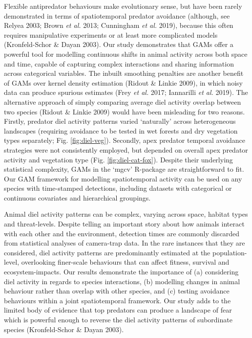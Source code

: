 \documentclass[11pt,a4paper,titlepage,twoside,openright]{style/unimelbthesis}
\begin{document}
\begin{mainmatter}
Flexible antipredator behaviours make evolutionary sense, but have been rarely demonstrated in terms of spatiotemporal predator avoidance (although, see Relyea 2003; Brown \emph{et al.} 2013; Cunningham \emph{et al.} 2019), because this often requires manipulative experiments or at least more complicated models (Kronfeld-Schor \& Dayan 2003). Our study demonstrates that GAMs offer a powerful tool for modelling continuous shifts in animal activity across both space and time, capable of capturing complex interactions and sharing information across categorical variables. The inbuilt smoothing penalties are another benefit of GAMs over kernel density estimation (Ridout \& Linkie 2009), in which noisy data can produce spurious estimates (Frey \emph{et al.} 2017; Iannarilli \emph{et al.} 2019). The alternative approach of simply comparing average diel activity overlap between two species (Ridout \& Linkie 2009) would have been misleading for two reasons. Firstly, predator diel activity patterns varied `naturally' across heterogeneous landscapes (requiring avoidance to be tested in wet forests and dry vegetation types separately; Fig. \ref{fig:diel-veg}). Secondly, apex predator temporal avoidance strategies were not consistently employed, but depended on overall apex predator activity and vegetation type (Fig. \ref{fig:diel-cat-fox}). Despite their underlying statistical complexity, GAMs in the `mgcv' R-package are straightforward to fit. Our GAM framework for modelling spatiotemporal activity can be used on any species with time-stamped detections, including datasets with categorical or continuous covariates and hierarchical groupings.

Animal diel activity patterns can be complex, varying across space, habitat types and threat-levels. Despite telling an important story about how animals interact with each other and the environment, detection times are commonly discarded from statistical analyses of camera-trap data. In the rare instances that they are considered, diel activity patterns are predominantly estimated at the population-level, overlooking finer-scale behaviours that can affect fitness, survival and ecosystem-impacts. Our results demonstrate the importance of (a) considering diel activity in regards to species interactions, (b) modelling changes in animal behaviour rather than overlap with other species, and (c) testing avoidance behaviours within a joint spatiotemporal framework. Our study adds to the limited body of evidence that top predators can produce a landscape of fear which is powerful enough to reverse the diel activity patterns of subordinate species (Kronfeld-Schor \& Dayan 2003).


\end{mainmatter}
\end{document}
